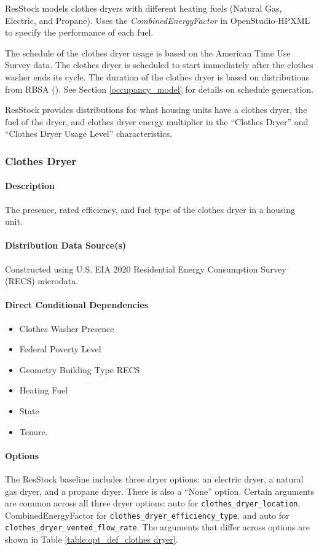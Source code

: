 ResStock models clothes dryers with different heating fuels (Natural Gas, Electric, and Propane). Uses the \textit{CombinedEnergyFactor} in OpenStudio-HPXML to specify the performance of each fuel.

The schedule of the clothes dryer usage is based on the American Time Use Survey data. The clothes dryer is scheduled to start immediately after the clothes washer ends its cycle. The duration of the clothes dryer is based on distributions from RBSA (\cite{RBSA}). See Section \ref{occupancy_model} for details on schedule generation.

ResStock provides distributions for what housing units have a clothes dryer, the fuel of the dryer, and clothes dryer energy multiplier in the “Clothes Dryer” and “Clothes Dryer Usage Level” characteristics. 

\subsubsection{Clothes Dryer}\label{clothes_dryer}
\paragraph{Description}
The presence, rated efficiency, and fuel type of the clothes dryer in a housing unit.

\paragraph{Distribution Data Source(s)}
Constructed using U.S. EIA 2020 Residential Energy Consumption Survey (RECS) microdata. 

\paragraph{Direct Conditional Dependencies}
\begin{itemize}
    \item Clothes Washer Presence
    \item Federal Poverty Level
    \item Geometry Building Type RECS
    \item Heating Fuel
    \item State
    \item Tenure.
\end{itemize}

\paragraph{Options}
The ResStock baseline includes three dryer options: an electric dryer, a natural gas dryer, and a propane dryer. There is also a ``None'' option. Certain arguments are common across all three dryer options: auto for \texttt{clothes\_dryer\_location}, CombinedEnergyFactor for \texttt{clothes\_dryer\_efficiency\_type}, and auto for \texttt{clothes\_dryer\_vented\_flow\_rate}. The arguments that differ across options are shown in Table \ref{table:opt_def_clothes dryer}. 

